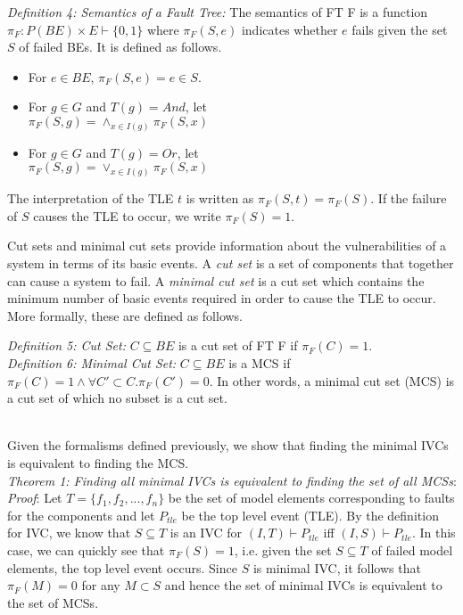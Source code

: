\textit{Definition 4: Semantics of a Fault Tree:} The semantics of FT F is a function $\pi_F : P(BE) \times E \vdash \{0,1\}$ where $\pi_F(S, e)$ indicates whether $e$ fails given the set $S$ of failed BEs. It is defined as follows. 

\begin{itemize}
\item For $e \in BE$, $\pi_F(S,e) = e \in S$.
\item For $g \in G$ and $T(g) = And$, let\\ $\pi_F(S,g) = \land_{x \in I(g)} \pi_F(S, x)$
\item For $g \in G$ and $T(g) = Or$, let\\ $\pi_F(S,g) = \lor_{x \in I(g)} \pi_F(S, x)$ 
\end{itemize}

The interpretation of the TLE $t$ is written as $\pi_F(S,t) = \pi_F(S)$. If the failure of $S$ causes the TLE to occur, we write $\pi_F(S) = 1$. 

Cut sets and minimal cut sets provide information about the vulnerabilities of a system in terms of its basic events. A \textit{cut set} is a set of components that together can cause a system to fail. A \textit{minimal cut set} is a cut set which contains the minimum number of basic events required in order to cause the TLE to occur. More formally, these are defined as follows. 

\textit{Definition 5: Cut Set:} $C \subseteq BE$ is a cut set of FT F if $\pi_F(C) = 1$. \\

\textit{Definition 6: Minimal Cut Set:} $C \subseteq BE$ is a MCS if $\pi_F(C) = 1 \land \forall C' \subset C. \pi_F(C') = 0$. In other words, a minimal cut set (MCS) is a cut set of which no subset is a cut set. 

\\
Given the formalisms defined previously, we show that finding the minimal IVCs is equivalent to finding the MCS. \\

\textit{Theorem 1: Finding all minimal IVCs is equivalent to finding the set of all MCSs}:\\
\textit{Proof}: Let $T = \{f_1, f_2, ..., f_n\}$ be the set of model elements corresponding to faults for the components and let $P_{tle}$ be the top level event (TLE). By the definition for IVC, we know that $S \subseteq T$ is an IVC for $(I, T) \vdash P_{tle}$ iff $(I, S) \vdash P_{tle}$. 
In this case, we can quickly see that $\pi_F(S) = 1$, i.e. given the set $S \subseteq T$ of failed model elements, the top level event occurs. 
Since $S$ is minimal IVC, it follows that $\pi_F(M) = 0$ for any $M \subset S$ and hence the set of minimal IVCs is equivalent to the set of MCSs. 


